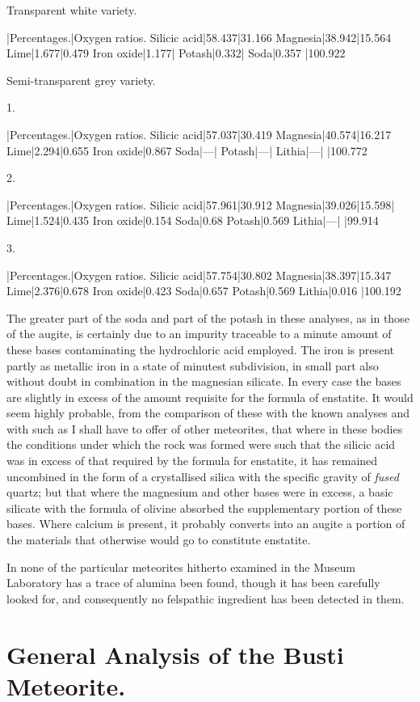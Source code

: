 \documentclass[a4paper, 12pt, oneside]{article}
\begin{document}
Transparent white variety.

|Percentages.|Oxygen ratios.  
Silicic acid|58.437|31.166  
Magnesia|38.942|15.564  
Lime|1.677|0.479  
Iron oxide|1.177|  
Potash|0.332|  
Soda|0.357  
|100.922  

Semi-transparent grey variety.

1.

|Percentages.|Oxygen ratios.  
Silicic acid|57.037|30.419  
Magnesia|40.574|16.217  
Lime|2.294|0.655  
Iron oxide|0.867  
Soda|---|  
Potash|---|  
Lithia|---|  
|100.772

2.

|Percentages.|Oxygen ratios.  
Silicic acid|57.961|30.912  
Magnesia|39.026|15.598|  
Lime|1.524|0.435  
Iron oxide|0.154  
Soda|0.68  
Potash|0.569  
Lithia|---|  
|99.914

3.

|Percentages.|Oxygen ratios.  
Silicic acid|57.754|30.802  
Magnesia|38.397|15.347  
Lime|2.376|0.678  
Iron oxide|0.423  
Soda|0.657  
Potash|0.569  
Lithia|0.016  
|100.192

The greater part of the soda and part of the potash in these analyses, as in those of the augite, is certainly due to an impurity traceable to a minute amount of these bases contaminating the hydrochloric acid employed. The iron is present partly as metallic iron in a state of minutest subdivision, in small part also without doubt in combination in the magnesian silicate. In every case the bases are slightly in excess of the amount requisite for the formula of enstatite. It would seem highly probable, from the comparison of these with the known analyses and with such as I shall have to offer of other meteorites, that where in these bodies the conditions under which the rock was formed were such that the silicic acid was in excess of that required by the formula for enstatite, it has remained uncombined in the form of a crystallised silica with the specific gravity of \emph{fused} quartz; but that where the magnesium and other bases were in excess, a basic silicate with the formula of olivine absorbed the supplementary portion of these bases. Where calcium is present, it probably converts into an augite a portion of the materials that otherwise would go to constitute enstatite.

In none of the particular meteorites hitherto examined in the Museum Laboratory has a trace of alumina been found, though it has been carefully looked for, and consequently no felspathic ingredient has been detected in them.
\clearpage
\section{General Analysis of the Busti Meteorite.}
\end{document}
